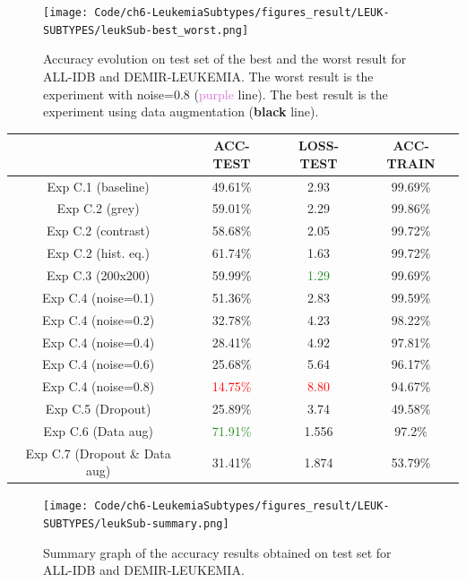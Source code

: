 \documentclass[11pt, openany]{report}
\theoremstyle{plain}
\theoremstyle{definition}
\theoremstyle{remark}
\begin{document}
\begin{center}

\begin{figure}[H]
  \centering
  \texttt{[image: Code/ch6-LeukemiaSubtypes/figures\_result/LEUK-SUBTYPES/leukSub-best\_worst.png]}
  \caption{Accuracy evolution on test set of the best and the worst result for ALL-IDB and DEMIR-LEUKEMIA. The worst result is the experiment with noise=0.8 (\textcolor{Orchid}{purple} line). The best result is the experiment using data augmentation (\textbf{black} line).}
  \label{fig:leukSub-best_worst}
\end{figure}


\begin{tabular}{|c|c|c|c|}
  \hline
          & \textbf{ACC-TEST} & \textbf{LOSS-TEST} & \textbf{ACC-TRAIN} \\
  \hline
  Exp C.1 (baseline) & 49.61\% & 2.93 & 99.69\% \\
  \hline
  Exp C.2 (grey) & 59.01\% & 2.29 & 99.86\%  \\ 
  Exp C.2 (contrast) & 58.68\% & 2.05 & 99.72\% \\ 
  Exp C.2 (hist. eq.) & 61.74\% & 1.63 & 99.72\% \\ 
  \hline
  Exp C.3 (200x200) & 59.99\% & \textcolor{ForestGreen}{1.29} & 99.69\% \\
  \hline
  Exp C.4 (noise=0.1) & 51.36\% & 2.83 & 99.59\%  \\ 
  Exp C.4 (noise=0.2) & 32.78\% & 4.23 & 98.22\% \\ 
  Exp C.4 (noise=0.4) & 28.41\% & 4.92 & 97.81\% \\
  Exp C.4 (noise=0.6) & 25.68\% & 5.64 & 96.17\%  \\ 
  Exp C.4 (noise=0.8) & \textcolor{red}{14.75\%} & \textcolor{red}{8.80} & 94.67\% \\
  \hline 
  Exp C.5 (Dropout) & 25.89\% & 3.74 & 49.58\% \\
  \hline
  Exp C.6 (Data aug) & \textcolor{ForestGreen}{71.91\%} & 1.556 & 97.2\% \\
  \hline
  Exp C.7 (Dropout \& Data aug) & 31.41\% & 1.874 & 53.79\% \\ 
  \hline
\end{tabular}
\label{table:summary-allidb-demir}

\begin{figure}[H]
  \centering
  \texttt{[image: Code/ch6-LeukemiaSubtypes/figures\_result/LEUK-SUBTYPES/leukSub-summary.png]}
  \caption{Summary graph of the accuracy results obtained on test set for ALL-IDB and DEMIR-LEUKEMIA.}
  \label{fig:summary_res-leukSub}
\end{figure}


\end{center}
\end{document}
